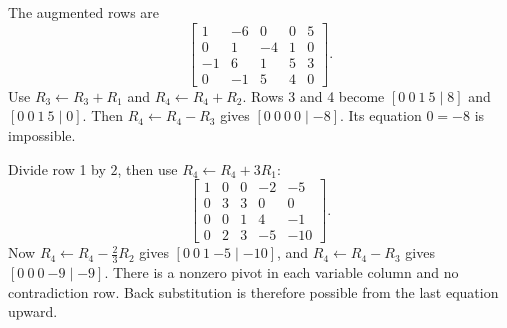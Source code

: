 The augmented rows are
\[
\begin{bmatrix}1&-6&0&0&5\\0&1&-4&1&0\\-1&6&1&5&3\\0&-1&5&4&0\end{bmatrix}.
\]
Use $R_3\leftarrow R_3+R_1$ and $R_4\leftarrow R_4+R_2$.
Rows 3 and 4 become $[0\ 0\ 1\ 5\mid8]$ and
$[0\ 0\ 1\ 5\mid0]$. Then $R_4\leftarrow R_4-R_3$
gives $[0\ 0\ 0\ 0\mid-8]$. Its equation $0=-8$ is impossible.

Divide row 1 by $2$, then use $R_4\leftarrow R_4+3R_1$:
\[
\begin{bmatrix}1&0&0&-2&-5\\0&3&3&0&0\\0&0&1&4&-1\\0&2&3&-5&-10\end{bmatrix}.
\]
Now $R_4\leftarrow R_4-\frac23R_2$ gives
$[0\ 0\ 1\ {-5}\mid-10]$, and $R_4\leftarrow R_4-R_3$
gives $[0\ 0\ 0\ {-9}\mid-9]$. There is a nonzero pivot in
each variable column and no contradiction row. Back substitution is
therefore possible from the last equation upward.

